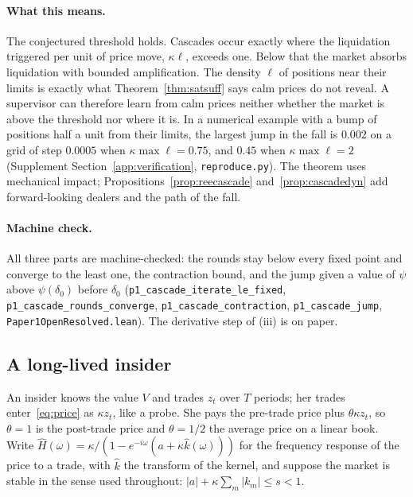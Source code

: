 \documentclass[12pt]{article}
\theoremstyle{definition}
\theoremstyle{remark}
\begin{document}
\paragraph{What this means.} The conjectured threshold holds. Cascades occur exactly where the liquidation triggered per unit of price move, $\kappa\ell$, exceeds one. Below that the market absorbs liquidation with bounded amplification. The density $\ell$ of positions near their limits is exactly what Theorem~\ref{thm:satsuff} says calm prices do not reveal. A supervisor can therefore learn from calm prices neither whether the market is above the threshold nor where it is. In a numerical example with a bump of positions half a unit from their limits, the largest jump in the fall is $0.002$ on a grid of step $0.0005$ when $\kappa\max\ell=0.75$, and $0.45$ when $\kappa\max\ell=2$ (Supplement Section~\ref{app:verification}, \nolinkurl{reproduce.py}). The theorem uses mechanical impact; Propositions~\ref{prop:reecascade} and~\ref{prop:cascadedyn} add forward-looking dealers and the path of the fall.

\paragraph{Machine check.} All three parts are machine-checked: the rounds stay below every fixed point and converge to the least one, the contraction bound, and the jump given a value of $\psi$ above $\psi(\delta_0)$ before $\delta_0$ (\texttt{p1\_cascade\_iterate\_le\_fixed}, \texttt{p1\_cascade\_rounds\_converge}, \texttt{p1\_cascade\_contraction}, \texttt{p1\_cascade\_jump}, \nolinkurl{Paper1OpenResolved.lean}). The derivative step of (iii) is on paper.

\subsection{A long-lived insider}

An insider knows the value $V$ and trades $z_t$ over $T$ periods; her trades enter~\eqref{eq:price} as $\kappa z_t$, like a probe. She pays the pre-trade price plus $\theta\kappa z_t$, so $\theta=1$ is the post-trade price and $\theta=1/2$ the average price on a linear book. Write $\hat H(\omega)=\kappa/(1-e^{-i\omega}(a+\kappa\hat k(\omega)))$ for the frequency response of the price to a trade, with $\hat k$ the transform of the kernel, and suppose the market is stable in the sense used throughout: $|a|+\kappa\sum_m|k_m|\le s<1$.
\end{document}
